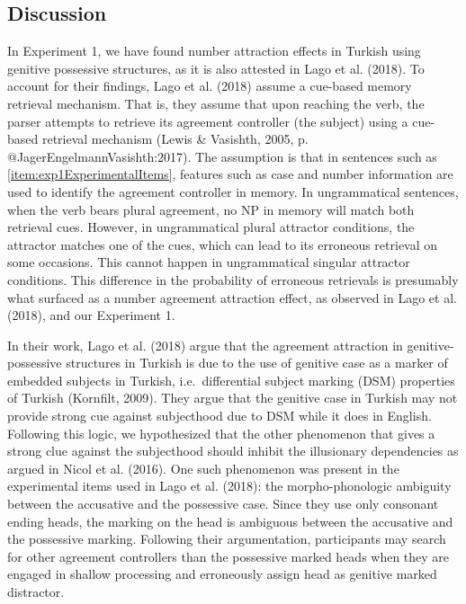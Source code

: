 \documentclass[
  english,
  doc,floatsintext]{apa6}
\begin{document}
\hypertarget{discussion}{%
\subsection{Discussion}\label{discussion}}

In Experiment 1, we have found number attraction effects in Turkish using genitive possessive structures, as it is also attested in Lago et al. (2018). To account for their findings, Lago et al. (2018) assume a cue-based memory retrieval mechanism. That is, they assume that upon reaching the verb, the parser attempts to retrieve its agreement controller (the subject) using a cue-based retrieval mechanism (Lewis \& Vasishth, 2005, p. @JagerEngelmannVasishth:2017). The assumption is that in sentences such as \ref{item:exp1ExperimentalItems}, features such as case and number information are used to identify the agreement controller in memory. In ungrammatical sentences, when the verb bears plural agreement, no NP in memory will match both retrieval cues. However, in ungrammatical plural attractor conditions, the attractor matches one of the cues, which can lead to its erroneous retrieval on some occasions. This cannot happen in ungrammatical singular attractor conditions. This difference in the probability of erroneous retrievals is presumably what surfaced as a number agreement attraction effect, as observed in Lago et al. (2018), and our Experiment 1.

In their work, Lago et al. (2018) argue that the agreement attraction in genitive-possessive structures in Turkish is due to the use of genitive case as a marker of embedded subjects in Turkish, i.e.~differential subject marking (DSM) properties of Turkish (Kornfilt, 2009). They argue that the genitive case in Turkish may not provide strong cue against subjecthood due to DSM while it does in English. Following this logic, we hypothesized that the other phenomenon that gives a strong clue against the subjecthood should inhibit the illusionary dependencies as argued in Nicol et al. (2016). One such phenomenon was present in the experimental items used in Lago et al. (2018): the morpho-phonologic ambiguity between the accusative and the possessive case. Since they use only consonant ending heads, the marking on the head is ambiguous between the accusative and the possessive marking. Following their argumentation, participants may search for other agreement controllers than the possessive marked heads when they are engaged in shallow processing and erroneously assign head as genitive marked distractor.
\end{document}
